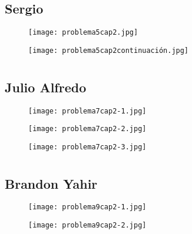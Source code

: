 \documentclass[12pt]{article}
\begin{document}
\subsection{{} Sergio}

\begin{figure}[htb] 
\centering \texttt{[image: problema5cap2.jpg]} 
\end{figure}
\newpage

\begin{figure}[htb] 
\centering \texttt{[image: problema5cap2continuación.jpg]} 
\end{figure}
\newpage

\section{ }
\subsection{{} Julio Alfredo}

\begin{figure}[htb] 
\centering \texttt{[image: problema7cap2-1.jpg]} 
\end{figure}
\newpage

\begin{figure}[htb] 
\centering \texttt{[image: problema7cap2-2.jpg]} 
\end{figure}
\newpage

\begin{figure}[htb] 
\centering \texttt{[image: problema7cap2-3.jpg]} 
\end{figure}
\newpage

\section{ }
\subsection{{} Brandon Yahir}

\begin{figure}[htb] 
\centering \texttt{[image: problema9cap2-1.jpg]} 
\end{figure}
\newpage

\begin{figure}[htb] 
\centering \texttt{[image: problema9cap2-2.jpg]} 
\end{figure}
\newpage
\end{document}
